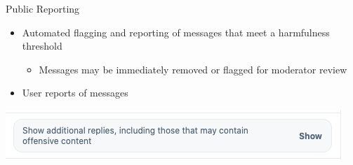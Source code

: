 \documentclass[nobackground,dvipsnames,table]{beamer}
\begin{document}
\begin{frame}{Public Reporting}
    \begin{itemize}
        \item Automated flagging and reporting of messages that meet a harmfulness threshold
        \begin{itemize}
            \item Messages may be immediately removed or flagged for moderator review
        \end{itemize}
        \item User reports of messages
    \end{itemize}
    \includegraphics[width=\textwidth]{show-offensive-content-twitter}
\end{frame}
\end{document}
